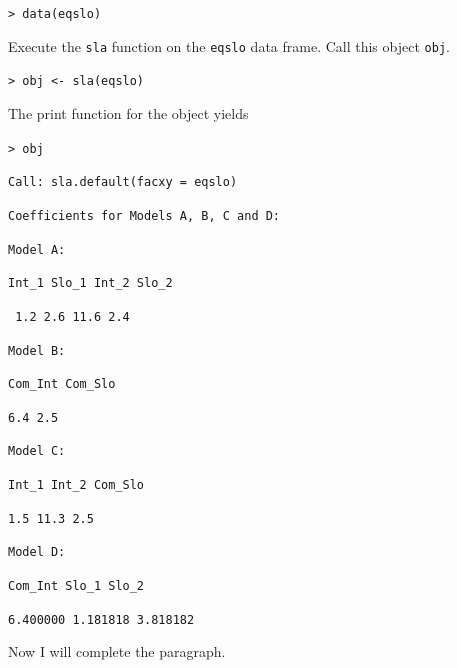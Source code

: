 \documentclass[11pt, oneside]{article}   	%
\begin{document}
\noindent \texttt{>  data(eqslo)} 

\vspace{3 mm}
 
\noindent Execute the \texttt{sla} function on the \texttt{eqslo} data frame.  Call this object \texttt{obj}.



\vspace{3 mm}

\noindent \texttt{> obj <- sla(eqslo) }

\vspace{3 mm}

\noindent The print function for the object yields
\vspace{2 mm} 

\noindent \texttt{> obj}

\vspace{1 mm}
\noindent \texttt{Call:  sla.default(facxy = eqslo)}

\vspace{3 mm}
\noindent \texttt{Coefficients for Models A, B, C and D:}

\vspace{3 mm}

\noindent \texttt{Model A:}

\noindent \texttt{Int\_1 Slo\_1 Int\_2 Slo\_2} 

\noindent \texttt{ \hspace{1mm}1.2   \hspace{ 2 mm}  2.6  \hspace{1 mm}11.6   \hspace{ 2 mm}        2.4} 

\noindent \vspace{1 mm}

\noindent \texttt{Model B:}

\noindent \texttt{Com\_Int Com\_Slo} 

\noindent \texttt{\hspace{7 mm}6.4  \hspace{6 mm}   2.5} 

\vspace{3 mm}

\noindent \texttt{Model C:}

\noindent \texttt{Int\_1   Int\_2 Com\_Slo}
 
\noindent \texttt{\hspace{3.5 mm}1.5 \hspace{1.5 mm}11.3   \hspace{5 mm}  2.5} 

\vspace{3 mm}

\noindent \texttt{Model D:}

\noindent \texttt{\hspace{3 mm}Com\_Int  \hspace{4.5 mm}  Slo\_1 \hspace{4.5 mm}   Slo\_2}

\noindent \texttt{6.400000 1.181818 3.818182}




\bigskip
\bigskip
\bigskip

Now I will complete the paragraph. 
\end{document}
